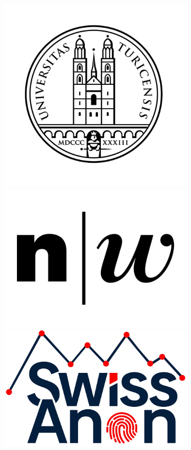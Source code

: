 \documentclass[a0,portrait]{a0poster}
\begin{document}
\noindent
\begin{figure}[h]
\begin{minipage}{.15\linewidth}
  \includegraphics[width=10cm]{Poster TEX/style/UZH.jpg} 
\end{minipage}
\begin{minipage}{.15\linewidth}
  \includegraphics[width=10cm]{Poster TEX/style/FHNW.png} 
\end{minipage}
\begin{minipage}{.15\linewidth}
  \includegraphics[width=10cm]{Poster TEX/style/SwissAnon.jpg} 

\end{minipage}
\end{figure}
\end{document}
